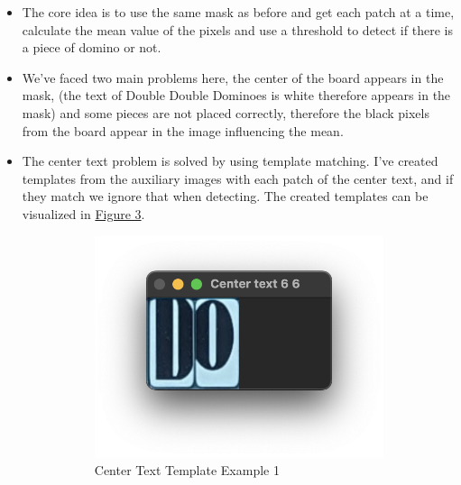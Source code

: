 \documentclass[12pt]{article}
\begin{document}
    \begin{itemize}
        \item The core idea is to use the same mask as before and get each patch at a time, calculate the mean value of the pixels and use a threshold to detect if there is a piece of domino or not.
        \item We've faced two main problems here, the center of the board appears in the mask, (the text of Double Double Dominoes is white therefore appears in the mask) and some pieces are not placed correctly, therefore the black pixels from the board appear in the image influencing the mean.
        \item The center text problem is solved by using template matching. I've created templates from the auxiliary images with each patch of the center text, and if they match we ignore that when detecting. The created templates can be visualized in \hyperref[fig:center-text-template-creation]{Figure 3}.
        \begin{figure}[!h]
            \centering
            \label{fig:center-text-template-creation}
            \begin{subfigure}{.5\textwidth}
                \centering
                \includegraphics[width=0.9\linewidth]{images/center_text_templates/1.png}
                \caption{Center Text Template Example 1}
                \label{fig:ctt-1}
            \end{subfigure}%
            \begin{subfigure}{.5\textwidth}
                \centering

\end{subfigure}
\end{figure}
\end{itemize}
\end{document}
